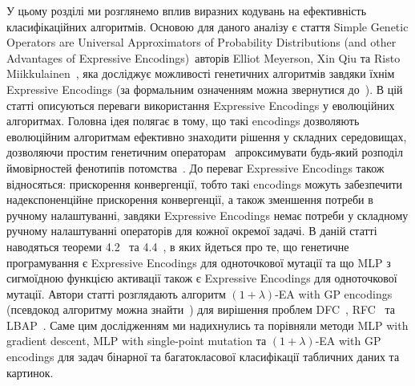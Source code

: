 У цьому розділі ми розглянемо вплив виразних кодувань на ефективність класифікаційних алгоритмів. Основою для даного аналізу є стаття \glqq Simple Genetic Operators are Universal Approximators of Probability Distributions (and other Advantages of Expressive Encodings)\grqq\ авторів Elliot Meyerson, Xin Qiu та Risto Miikkulainen~\cite{ct25}, яка досліджує можливості генетичних алгоритмів завдяки їхнім Expressive Encodings (за формальним означенням можна звернутися до~\cite[Definition 1, стор. 3]{ct25}). В цій статті описуються переваги використання Expressive Encodings у еволюційних алгоритмах. Головна ідея полягає в тому, що такі encodings дозволяють еволюційним алгоритмам ефективно знаходити рішення у складних середовищах, дозволяючи простим генетичним операторам~\cite[підрозділ 2.2.3, стор. 3]{ct25} апроксимувати будь-який розподіл ймовірностей фенотипів потомства~\cite[розділ 2.1, стор. 2]{ct25}. До переваг Expressive Encodings також відносяться: прискорення конвергенції, тобто такі encodings можуть забезпечити надекспоненційне прискорення конвергенції, а також зменшення потреби в ручному налаштуванні, завдяки Expressive Encodings немає потреби у складному ручному налаштуванні операторів для кожної окремої задачі. В даній статті наводяться теореми 4.2~\cite[Theorem 4.2]{ct25} та 4.4~\cite[Theorem 4.4]{ct25}, в яких йдеться про те, що генетичне програмування є Expressive Encodings для одноточкової мутації та що MLP з сигмоїдною функцією активації також є Expressive Encodings для одноточкової мутації. Автори статті розглядають алгоритм $(1+\lambda)$-EA with GP encodings (псевдокод алгоритму можна знайти~\cite[Appendix B, стор. 12]{ct25}) для вирішення проблем DFC~\cite[Problem 1, стор. 6]{ct25}, RFC~\cite[Problem 2, стор. 7]{ct25} та LBAP~\cite[Problem 3, стор. 7]{ct25}. Саме цим дослідженням ми надихнулись та порівняли методи MLP with gradient descent, MLP with single-point mutation та $(1+\lambda)$-EA with GP encodings для задач бінарної та багатокласової класифікації табличних даних та картинок.

\chapconclude{\ref{chap:theory}}

